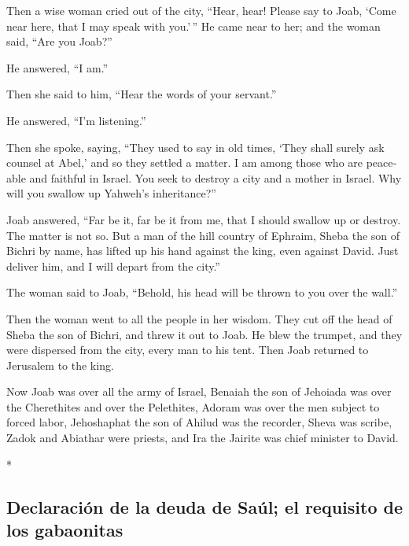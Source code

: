 \begin{paracol}{2}
\begin{otherlanguage}{english}
 Then a wise woman cried out of the city, ``Hear, hear!
Please say to Joab, `Come near here, that I may speak with you.'\,''
 He came near to her; and the woman said, ``Are you
Joab?''

He answered, ``I am.''

Then she said to him, ``Hear the words of your servant.''

He answered, ``I'm listening.''

 Then she spoke, saying, ``They used to say in old times,
`They shall surely ask counsel at Abel,' and so they settled a matter.
 I am among those who are peaceable and faithful in
Israel. You seek to destroy a city and a mother in Israel. Why will you
swallow up Yahweh's inheritance?''

 Joab answered, ``Far be it, far be it from me, that I
should swallow up or destroy.  The matter is not so. But
a man of the hill country of Ephraim, Sheba the son of Bichri by name,
has lifted up his hand against the king, even against David. Just
deliver him, and I will depart from the city.''

The woman said to Joab, ``Behold, his head will be thrown to you over
the wall.''

 Then the woman went to all the people in her wisdom.
They cut off the head of Sheba the son of Bichri, and threw it out to
Joab. He blew the trumpet, and they were dispersed from the city, every
man to his tent. Then Joab returned to Jerusalem to the king.

 Now Joab was over all the army of Israel, Benaiah the
son of Jehoiada was over the Cherethites and over the Pelethites,
 Adoram was over the men subject to forced labor,
Jehoshaphat the son of Ahilud was the recorder,  Sheva
was scribe, Zadok and Abiathar were priests,  and Ira the
Jairite was chief minister to David.

\end{otherlanguage}

\switchcolumn[0]*

\hypertarget{declaraciuxf3n-de-la-deuda-de-sauxfal-el-requisito-de-los-gabaonitas}{%
\subsection{Declaración de la deuda de Saúl; el requisito de los
gabaonitas}\label{declaraciuxf3n-de-la-deuda-de-sauxfal-el-requisito-de-los-gabaonitas}}


\end{paracol}
